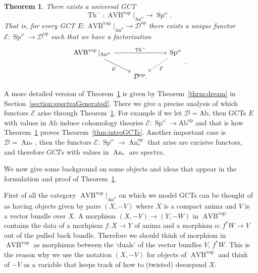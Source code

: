 \documentclass{article}
\newcommand{\cD}{\mathcal{D}}
\newcommand{\Ab}{\mathrm{Ab}}
\newcommand{\op}{\mathrm{op}}
\newcommand{\vop}{\mathrm{vop}}
\DeclareMathOperator{\AVB}{AVB}
\DeclareMathOperator{\An}{An}
\DeclareMathOperator{\Sp}{Sp}
\DeclareMathOperator{\Th}{Th}
\newtheorem{theorem}{Theorem}
\begin{document}
\begin{theorem}\label{thm:introUniversalGCT} There exists a universal GCT
    \[\Th^- \colon \AVB^\vop|_{\An^\omega} \to \Sp^\omega. \]
That is, for every GCT $E \colon \AVB^\vop|_{\An^\omega} \to \cD^\op$ there exists 
a unique functor $\mathcal E \colon \Sp^\omega \to \cD^\op$ such that we have a factorization
\[\begin{tikzcd}
	{\AVB^\vop|_{\An^\omega}} && {\Sp^\omega} \\
	& {\mathcal D^\op}
	\arrow["{\Th^-}", from=1-1, to=1-3]
	\arrow["{\mathcal E}", dashed, from=1-3, to=2-2]
	\arrow["E"', from=1-1, to=2-2].
\end{tikzcd}.\]
\end{theorem}
A more detailed version of Theorem~\ref{thm:introUniversalGCT} is given by 
Theorem~\ref{thrm:dream} in Section~\ref{section:spectraGenerated}. There we give a 
precise analysis of which functors $\mathcal E$ arise through Theorem~\ref{thm:introUniversalGCT}.
For example if we let $\cD = \Ab$, then GCTs $E$ with values in $\Ab$ induce 
cohomology theories $\mathcal E \colon \Sp^\omega \to \Ab^\op$ and that is how 
Theorem~\ref{thm:introUniversalGCT} proves Theorem~\ref{thm:introGCTs}.
Another important case is $\cD = \An_*$, then the functors $\mathcal E \colon \Sp^\omega \to \An_*^\op$
that arise are excisive functors, and therefore $GCTs$ with values in $\An_*$ are spectra.

\medskip

We now give some background on some objects and ideas that appear in the formulation and 
proof of Theorem~\ref{thm:introUniversalGCT}.

First of all the category $\AVB^\vop|_{\An^\omega}$ on which we model GCTs can be thought of as having objects given by pairs $(X,-V)$ where $X$ is a compact anima and $V$ is a vector bundle over $X$.
A morphism $(X,-V) \to (Y,-W)$ in $\AVB^\vop$ contains the data of a morhpism $f \colon X \to Y$ of anima and a morphism 
$\alpha \colon f^*W \to V$ out of the pulled back bundle.
Therefore we should think of morphism in $\AVB^\vop$ as morphisms between the `duals' of the vector bundles $V$, $f^*W$.
This is the reason why we use the notation $(X,-V)$ for objects of $\AVB^\vop$ and think of $-V$ as a
variable that keeps track of how to (twisted) desuspend $X$.
\end{document}
